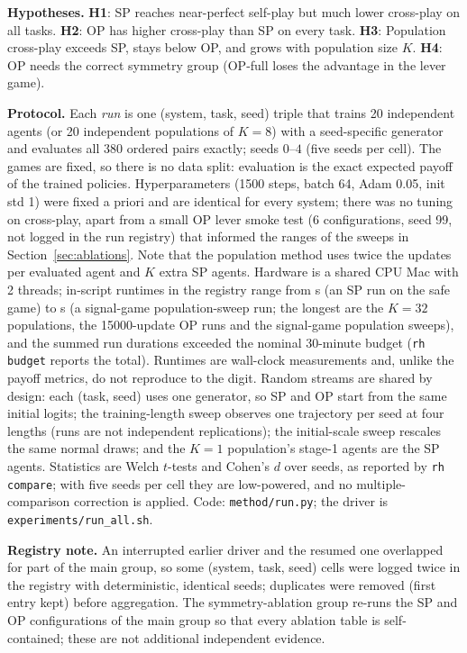 \textbf{Hypotheses.} \textbf{H1}: SP reaches near-perfect self-play but much lower cross-play on all tasks. \textbf{H2}: OP has higher cross-play than SP on every task. \textbf{H3}: Population cross-play exceeds SP, stays below OP, and grows with population size $K$. \textbf{H4}: OP needs the correct symmetry group (OP-full loses the advantage in the lever game).

\textbf{Protocol.} Each \emph{run} is one (system, task, seed) triple that trains 20 independent agents (or 20 independent populations of $K=8$) with a seed-specific generator and evaluates all 380 ordered pairs exactly; seeds $0$--$4$ (five seeds per cell). The games are fixed, so there is no data split: evaluation is the exact expected payoff of the trained policies. Hyperparameters (1500 steps, batch 64, Adam 0.05, init std 1) were fixed a priori and are identical for every system; there was no tuning on cross-play, apart from a small OP lever smoke test (6 configurations, seed 99, not logged in the run registry) that informed the ranges of the sweeps in Section~\ref{sec:ablations}. Note that the population method uses twice the updates per evaluated agent and $K$ extra SP agents. Hardware is a shared CPU Mac with 2 threads; in-script runtimes in the registry range from  s (an SP run on the safe game) to  s (a signal-game population-sweep run; the longest are the $K=32$ populations, the 15000-update OP runs and the signal-game population sweeps), and the summed run durations exceeded the nominal 30-minute budget (\texttt{rh budget} reports the total). Runtimes are wall-clock measurements and, unlike the payoff metrics, do not reproduce to the digit. Random streams are shared by design: each (task, seed) uses one generator, so SP and OP start from the same initial logits; the training-length sweep observes one trajectory per seed at four lengths (runs are not independent replications); the initial-scale sweep rescales the same normal draws; and the $K=1$ population's stage-1 agents are the SP agents. Statistics are Welch $t$-tests and Cohen's $d$ over seeds, as reported by \texttt{rh compare}; with five seeds per cell they are low-powered, and no multiple-comparison correction is applied. Code: \texttt{method/run.py}; the driver is \texttt{experiments/run\_all.sh}.

\textbf{Registry note.} An interrupted earlier driver and the resumed one overlapped for part of the main group, so some (system, task, seed) cells were logged twice in the registry with deterministic, identical seeds; duplicates were removed (first entry kept) before aggregation. The symmetry-ablation group re-runs the SP and OP configurations of the main group so that every ablation table is self-contained; these are not additional independent evidence.
